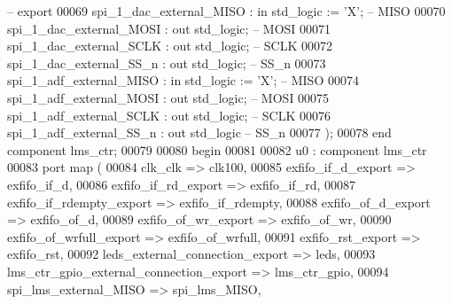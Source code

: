 \begin{DoxyCode}
{      -- export}
00069          spi_1_dac_external_MISO                 : \textcolor{keywordflow}{in}    \textcolor{comment}{std\_logic}                    := 'X';             \textcolor{keyword}{
      -- MISO}
00070          spi_1_dac_external_MOSI                 : \textcolor{keywordflow}{out}   \textcolor{comment}{std\_logic};                                       \textcolor{keyword}{
      -- MOSI}
00071          spi_1_dac_external_SCLK                 : \textcolor{keywordflow}{out}   \textcolor{comment}{std\_logic};                                       \textcolor{keyword}{
      -- SCLK}
00072          spi_1_dac_external_SS_n                 : \textcolor{keywordflow}{out}   \textcolor{comment}{std\_logic};                                       \textcolor{keyword}{
      -- SS\_n}
00073          spi_1_adf_external_MISO                 : \textcolor{keywordflow}{in}    \textcolor{comment}{std\_logic}                    := 'X';             \textcolor{keyword}{
      -- MISO}
00074          spi_1_adf_external_MOSI                 : \textcolor{keywordflow}{out}   \textcolor{comment}{std\_logic};                                       \textcolor{keyword}{
      -- MOSI}
00075          spi_1_adf_external_SCLK                 : \textcolor{keywordflow}{out}   \textcolor{comment}{std\_logic};                                       \textcolor{keyword}{
      -- SCLK}
00076          spi_1_adf_external_SS_n                 : \textcolor{keywordflow}{out}   \textcolor{comment}{std\_logic}\textcolor{keyword}{                                       
       -- SS\_n}
00077       );    
00078     \textcolor{keywordflow}{end} \textcolor{keywordflow}{component} \textcolor{vhdlchar}{lms_ctr};
00079   
00080 \textcolor{vhdlkeyword}{begin}
00081 
00082    u0 : \textcolor{keywordflow}{component} lms_ctr
00083       \textcolor{keywordflow}{port} \textcolor{keywordflow}{map} (
00084          clk_clk                                 => clk100,
00085          exfifo_if_d_export                      => exfifo_if_d,
00086          exfifo_if_rd_export                     => exfifo_if_rd,
00087          exfifo_if_rdempty_export                => exfifo_if_rdempty,
00088          exfifo_of_d_export                      => exfifo_of_d,
00089          exfifo_of_wr_export                     => exfifo_of_wr,
00090          exfifo_of_wrfull_export                 => exfifo_of_wrfull,
00091          exfifo_rst_export                       => exfifo_rst,
00092          leds_external_connection_export         => leds,
00093          lms_ctr_gpio_external_connection_export => lms_ctr_gpio,
00094          spi_lms_external_MISO                   => spi_lms_MISO,

\end{DoxyCode}
